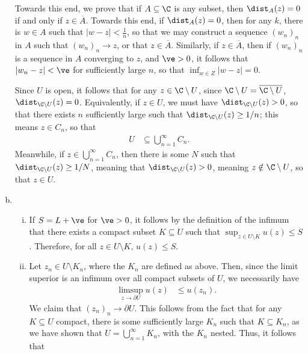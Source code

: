 \documentclass[10pt]{mypackage}
\begin{document}
\begin{solution}
\begin{enumerate}[(a)]
      Towards this end, we prove that if $A\subseteq \C$ is any subset, then $ \dist_{A}(z) = 0 $ if and only if $z\in \overline{A}$. Towards this end, if $\dist_{A}(z) = 0$, then for any $k$, there is $w\in A$ such that $\left\vert w-z \right\vert < \frac{1}{n}$, so that we may construct a sequence $\left( w_n \right)_n$ in $A$ such that $\left( w_n \right)_n\rightarrow z$, or that $z\in \overline{A}$. Similarly, if $z\in \overline{A}$, then if $\left( w_n \right)_n$ is a sequence in $A$ converging to $z$, and $\ve > 0$, it follows that $\left\vert w_n - z \right\vert < \ve$ for sufficiently large $n$, so that $\inf_{w\in Z}\left\vert w-z \right\vert = 0$.\newline

      Since $U$ is open, it follows that for any $z\in \C\setminus U$, since $\C\setminus U = \overline{\C\setminus U}$, $\dist_{\C\setminus U} (z) = 0$. Equivalently, if $z\in U$, we must have $\dist_{\C\setminus U}(z) > 0$, so that there exists $n$ sufficiently large such that $\dist_{\C\setminus U}(z) \geq 1/n$; this means $z\in C_n$, so that
      \begin{align*}
        U &\subseteq \bigcup_{n=1}^{\infty}C_n.
      \end{align*}
      Meanwhile, if $z\in \bigcup_{n=1}^{\infty}C_n$, then there is some $N$ such that $\dist_{\C\setminus U}(z) \geq 1/N$, meaning that $\dist_{\C\setminus U}(z) > 0$, meaning $z\notin \C\setminus U$, so that $z\in U$.
    \item\hfill
      \begin{enumerate}[(i)]
        \item If $S = L + \ve$ for $\ve > 0$, it follows by the definition of the infimum that there exists a compact subset $K\subseteq U$ such that $\sup_{z\in U\setminus K} u(z) \leq S$. Therefore, for all $z\in U\setminus K$, $u(z)\leq S$.
        \item Let $z_n\in U\setminus K_n$, where the $K_n$ are defined as above. Then, since the limit superior is an infimum over all compact subsets of $U$, we necessarily have
          \begin{align*}
            \limsup_{z\rightarrow \partial U} u(z) &\leq u\left( z_n \right).
          \end{align*}
          We claim that $\left( z_n \right)_n \rightarrow \partial U$. This follows from the fact that for any $K\subseteq U$ compact, there is some sufficiently large $K_n$ such that $K\subseteq K_n$, as we have shown that $U = \bigcup_{n=1}^{\infty}K_n$, with the $K_n$ nested. Thus, it follows that

\end{enumerate}
\end{enumerate}
\end{solution}
\end{document}
